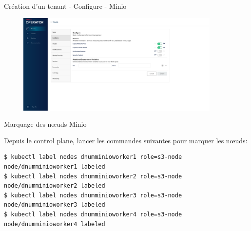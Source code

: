 
\begin{frame}[fragile]{Création d'un tenant - Configure - Minio}

\begin{figure}
\begin{center}
\includegraphics[angle=0, width=0.9\textwidth, height=0.8\textheight]{images/configure_minio.eps}
\end{center}
\end{figure}

\end{frame}


\begin{frame}[fragile]{Marquage des n\oe{}uds Minio}

   Depuis le control plane, lancer les commandes suivantes pour marquer les n\oe{}uds:
\begin{Verbatim}[commandchars=\\\{\}]
$ kubectl label nodes dnumminioworker1 role=s3-node
node/dnumminioworker1 labeled
$ kubectl label nodes dnumminioworker2 role=s3-node
node/dnumminioworker2 labeled
$ kubectl label nodes dnumminioworker3 role=s3-node
node/dnumminioworker3 labeled
$ kubectl label nodes dnumminioworker4 role=s3-node
node/dnumminioworker4 labeled
\end{Verbatim}

\end{frame}



